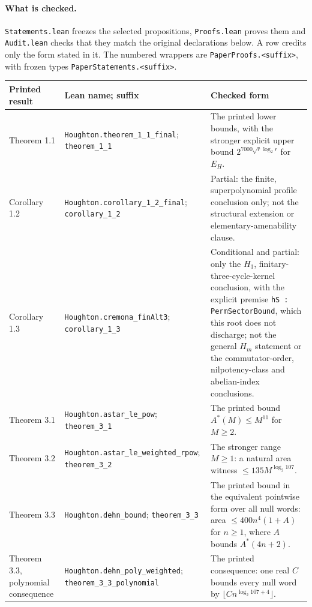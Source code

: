 \documentclass[11pt,a4paper]{article}
\theoremstyle{plain}
\theoremstyle{definition}
\theoremstyle{remark}
\begin{document}
\paragraph{What is checked.}
\nolinkurl{Statements.lean} freezes the selected propositions,
\nolinkurl{Proofs.lean} proves them and \nolinkurl{Audit.lean} checks that
they match the original declarations below. A row credits only the form
stated in it. The numbered wrappers are \nolinkurl{PaperProofs.<suffix>},
with frozen types \nolinkurl{PaperStatements.<suffix>}.

\begingroup\small
\setlength{\tabcolsep}{3pt}
\renewcommand{\arraystretch}{1.15}
\begin{longtable}{@{}>{\raggedright\arraybackslash}p{}>{\raggedright\arraybackslash}p{}>{\raggedright\arraybackslash}p{}@{}}
\toprule
Printed result & Lean name; suffix & Checked form \\
\midrule
\endhead
Theorem 1.1 & \nolinkurl{Houghton.theorem_1_1_final}; \nolinkurl{theorem_1_1} & The printed lower bounds, with the stronger explicit upper bound $2^{7000\sqrt r\log_2 r}$ for $E_H$. \\
Corollary 1.2 & \nolinkurl{Houghton.corollary_1_2_final}; \nolinkurl{corollary_1_2} & Partial: the finite, superpolynomial profile conclusion only; not the structural extension or elementary-amenability clause. \\
Corollary 1.3 & \nolinkurl{Houghton.cremona_finAlt3}; \nolinkurl{corollary_1_3} & Conditional and partial: only the $H_3$, finitary-three-cycle-kernel conclusion, with the explicit premise \nolinkurl{hS : PermSectorBound}, which this root does not discharge; not the general $H_m$ statement or the commutator-order, nilpotency-class and abelian-index conclusions. \\
Theorem 3.1 & \nolinkurl{Houghton.astar_le_pow}; \nolinkurl{theorem_3_1} & The printed bound $A^*(M)\le M^{11}$ for $M\ge2$. \\
Theorem 3.2 & \nolinkurl{Houghton.astar_le_weighted_rpow}; \nolinkurl{theorem_3_2} & The stronger range $M\ge1$: a natural area witness $\le135M^{\log_2 107}$. \\
Theorem 3.3 & \nolinkurl{Houghton.dehn_bound}; \nolinkurl{theorem_3_3} & The printed bound in the equivalent pointwise form over all null words: area $\le400n^4(1+A)$ for $n\ge1$, where $A$ bounds $A^*(4n+2)$. \\
Theorem 3.3, polynomial consequence & \nolinkurl{Houghton.dehn_poly_weighted}; \nolinkurl{theorem_3_3_polynomial} & The printed consequence: one real $C$ bounds every null word by $\lfloor Cn^{\log_2 107+4}\rfloor$. \\

\end{longtable}
\end{document}
